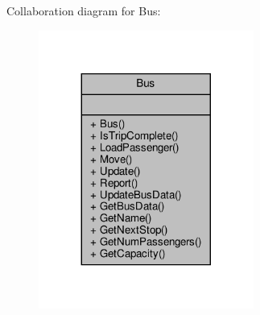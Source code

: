 Collaboration diagram for Bus\+:\nopagebreak
\begin{figure}[H]
\begin{center}
\leavevmode
\includegraphics[width=200pt]{classBus__coll__graph}
\end{center}
\end{figure}
